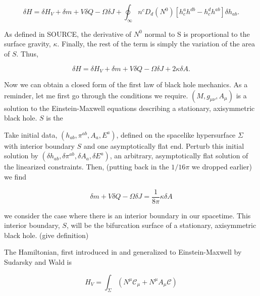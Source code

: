 \documentclass[titlepage]{article}
\def\beq{\begin{equation}}
\def\eeq{\end{equation}}
\begin{document}
\beq
\delta H = \delta H_V + \delta m + V\delta Q - \Omega \delta J +\oint_\infty n^c  D_d \left(N^0\right) \left[ h_c^ah^{db}-h_c^dh^{ab} \right] \delta h_{ab}.
\eeq

\noindent
As defined in SOURCE, the derivative of $N^0$ normal to S is proportional to the surface gravity, $\kappa$.  Finally, the rest of the term is simply the variation of the area of $S$.  Thus,

\beq
\delta H = \delta H_V + \delta m + V\delta Q - \Omega \delta J + 2\kappa \delta A.
\eeq


Now we can obtain a closed form of the first law of black hole mechanics.  As a reminder, let me first go through the conditions we require.  $(M,g_{\mu\nu},A_\mu)$ is a solution to the Einstein-Maxwell equations describing a stationary, axisymmetric black hole.  $S$ is the 

Take initial data, $( h_{ab},\pi^{ab}, A_a, E^a)$, defined on the spacelike hypersurface $\Sigma$ with interior boundary $S$ and one asymptotically flat end.  Perturb this initial solution by $(\delta h_{ab},\delta\pi^{ab},\delta A_a,\delta E^a)$, an arbitrary, asymptotically flat solution of the linearized constraints.  Then, (putting back in the $1/16\pi$ we dropped earlier) we find 

\beq
\delta m + V \delta Q -\Omega \delta J= \frac{1}{8\pi} \kappa \delta A
\eeq



we consider the case where there is an interior boundary in our spacetime.  This interior boundary, $S$, will be the bifurcation surface of a stationary, axisymmetric black hole. (give definition) 






\newpage

The Hamiltonian, first introduced in \cite{regge1974improved} and generalized to Einstein-Maxwell by Sudarsky and Wald \cite{sudarskyExtrema92} is 

\beq
H_V=\int_\Sigma\left(N^\mu\mathcal{C}_\mu+N^\mu A_\mu \mathcal{C} \right)
\eeq
\end{document}
